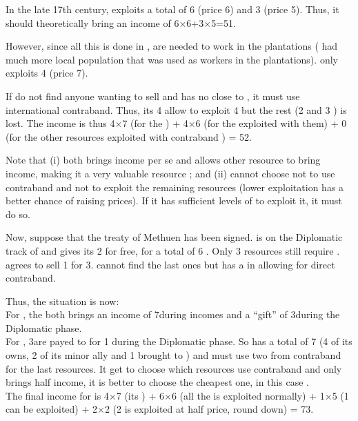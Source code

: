 \begin{exemple}
  In the late 17th century, \ANG exploits a total of 6 
  (price 6) and 3  (price 5). Thus, it should
  theoretically bring an income of 6$\times$6+3$\times$5=51\ducats.

  However, since all this is done in , 
  are needed to work in the plantations ( had much more
  local population that was used as workers in the plantations). \ANG
  only exploits 4  (price 7).

  If \ANG do not find anyone wanting to sell  and has no
  \TradeFLEET close to , it must use international
  contraband. Thus, its 4  allow to exploit 4 
  but the rest (2  and 3 ) is
  lost. The income is thus 4$\times$7 (for the ) +
  4$\times$6 (for the  exploited with them) + 0 (for the
  other resources exploited with contraband ) = 52.

  Note that (i)  both brings income per se and allows other
  resource to bring income, making it a very valuable resource ; and
  (ii) \ANG cannot choose not to use contraband  and not to
  exploit the remaining resources (lower exploitation has a better
  chance of raising prices). If it has sufficient levels of \COL to
  exploit it, it must do so.

  Now, suppose that the treaty of Methuen has been signed. \paysPortugal
  is on the Diplomatic track of \ANG and gives its 2  for
  free, for a total of 6 . Only 3 resources still require
  . \HIS agrees to sell 1  for 3\ducats. \ANG
  cannot find the last ones but has a \TradeFLEET in 
  allowing for direct contraband.

  Thus, the situation is now:\\
  For \HIS, the  both brings an income of 7\ducats during
  incomes and a ``gift'' of 3\ducats during the Diplomatic phase.\\
  For \ANG, 3\ducats are payed to \HIS for 1  during the
  Diplomatic phase. So \ANG has a total of 7  (4 of its
  owns, 2 of its minor ally and 1 brought to \HIS) and must use two from
  contraband for the last resources. It get to choose which resources
  use contraband  and only brings half income, it is better
  to choose the cheapest one, in this case .\\
  The final income for \ANG is 4$\times$7 (its ) +
  6$\times$6 (all the  is exploited normally) + 1$\times$5 (1
   can be exploited) + 2$\times$2 (2
   is exploited at half price, round down) =
  73\ducats.
\end{exemple}

